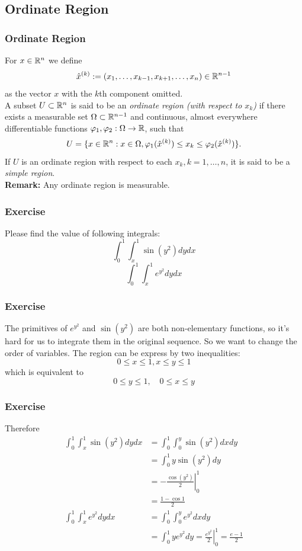 \documentclass[12pt, t]{beamer}
\renewcommand{\emph}[1]{{\color{Turquoise3}\textsl{#1}}}
\newcommand{\Remark}{\textbf{Remark: }}
\begin{document}
\subsection{Ordinate Region}
\begin{frame}
    \frametitle{Ordinate Region}
    For $x\in\mathbb{R}^n$ we define
    \[\hat{x}^{(k)}:=(x_1,\ldots,x_{k-1},x_{k+1},\ldots,
        x_n)\in\mathbb{R}^{n-1}\]
    as the vector $x$ with the $k$th component omitted.\\[4pt]
    A subset $U\subset\mathbb{R}^n$ is said to be an \emph{ordinate region (with respect to $x_k$)} if there exists a measurable set $\Omega\subset\mathbb{R}^{n-1}$ and continuous, almost everywhere dif{}ferentiable functions $\varphi_1,\varphi_2:\Omega\to\mathbb{R}$, such that
    \[U=\{x\in\mathbb{R}^n:x\in\Omega,\varphi_1(\hat{x}^{(k)})\leq
        x_k\leq\varphi_2(\hat{x}^{(k)})\}.\]
    If $U$ is an ordinate region with respect to each $x_k,k=1,\ldots,n$, it is said to be a \emph{simple region}.\\[6pt]
    \Remark Any ordinate region is measurable.
\end{frame}

\begin{frame}
    \frametitle{Exercise}
    Please find the value of following integrals:
    $$\int_{0}^{1} \int_{x}^{1} \sin \left(y^{2}\right) d y d x$$
    $$\int_{0}^{1} \int_{x}^{1} e^{y^{2}} d y d x$$
\end{frame}

\begin{frame}
    \frametitle{Exercise}
    The primitives of $e^{y^{2}}$ and $\sin \left(y^{2}\right)$ are both non-elementary functions, so it's hard for us to integrate them in the original sequence. So we want to change the order of variables. The region can be express by two inequalities:
    \[
        0 \leq x \leq 1, x \leq y \leq 1
    \]
    which is equivalent to
    \[
        0 \leq y \leq 1, \quad 0 \leq x \leq y
    \]
\end{frame}

\begin{frame}
    \frametitle{Exercise}
    Therefore
    \[
        \begin{aligned}
            \int_{0}^{1} \int_{x}^{1} \sin \left(y^{2}\right) d y d x & =\int_{0}^{1} \int_{0}^{y} \sin \left(y^{2}\right) d x d y                            \\
                                                                      & =\int_{0}^{1} y \sin \left(y^{2}\right) d y                                           \\&=               -\left.\frac{\cos \left(y^{2}\right)}{2}\right|_{0} ^{1}\\&=\frac{1-\cos 1}{2}          \\
            \int_{0}^{1} \int_{x}^{1} e^{y^{2}} d y d x               & =\int_{0}^{1} \int_{0}^{y} e^{y^{2}} d x d y                                          \\
                                                                      & =\int_{0}^{1} y e^{y^{2}} d y=\left.\frac{e^{y^{2}}}{2}\right|_{0} ^{1}=\frac{e-1}{2}
        \end{aligned}
    \]


\end{frame}
\end{document}
